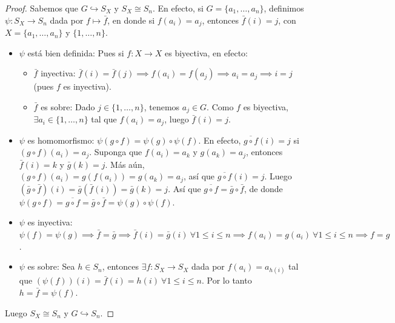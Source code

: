 \begin{proof}
    Sabemos que $G \hookrightarrow S_X$ y $S_X \cong S_n$. En efecto, si $G = \{a_1, \dots, a_n\}$, definimos $\psi: S_X \to S_n$ dada por $f \mapsto \bar{f}$, en donde si $f(a_i) = a_j$, entonces $\bar{f}(i) = j$, con $X = \{a_1, \dots, a_n\}$ y $\{1, \dots, n\}$.

    \begin{itemize}
        \item $\psi$ está bien definida:
        Pues si $f: X \to X$ es biyectiva, en efecto:
        
        \begin{itemize}
            \item $\bar{f}$ inyectiva:
            $\bar{f}(i) = \bar{f}(j) \implies f(a_i) = f(a_j) \implies a_i = a_j \implies i = j$ (pues $f$ es inyectiva).
            
            \item $\bar{f}$ es sobre:
            Dado $j \in \{1, \dots, n\}$, tenemos $a_j \in G$. Como $f$ es biyectiva, $\exists a_i \in \{1, \dots, n\}$ tal que $f(a_i) = a_j$, luego $\bar{f}(i) = j$.
        \end{itemize}

        \item $\psi$ es homomorfismo:
        $\psi(g \circ f) = \psi(g) \circ \psi(f)$. En efecto, $\overline{g \circ f}(i) = j$ si $(g \circ f)(a_i) = a_j$.
        Suponga que $f(a_i) = a_k$ y $g(a_k) = a_j$, entonces $\bar{f}(i) = k$ y $\bar{g}(k) = j$.
        Más aún, $(g \circ f)(a_i) = g(f(a_i)) = g(a_k) = a_j$, así que $\overline{g \circ f}(i) = j$.
        Luego $(\bar{g} \circ \bar{f})(i) = \bar{g}(\bar{f}(i)) = \bar{g}(k) = j$.
        Así que $\overline{g \circ f} = \bar{g} \circ \bar{f}$, de donde $\psi(g \circ f) = \overline{g \circ f} = \bar{g} \circ \bar{f} = \psi(g) \circ \psi(f)$.

        \item $\psi$ es inyectiva:
        $\psi(f) = \psi(g) \implies \bar{f} = \bar{g} \implies \bar{f}(i) = \bar{g}(i) \ \forall 1 \leq i \leq n \implies f(a_i) = g(a_i) \ \forall 1 \leq i \leq n \implies f = g$.

        \item $\psi$ es sobre:
        Sea $h \in S_n$, entonces $\exists f: S_X \to S_X$ dada por $f(a_i) = a_{h(i)}$ tal que $(\psi(f))(i) = \bar{f}(i) = h(i) \ \forall 1 \leq i \leq n$. Por lo tanto $h = \bar{f} = \psi(f)$.
    \end{itemize}
    
    Luego $S_X \cong S_n$ y $G \hookrightarrow S_n$.
\end{proof}

